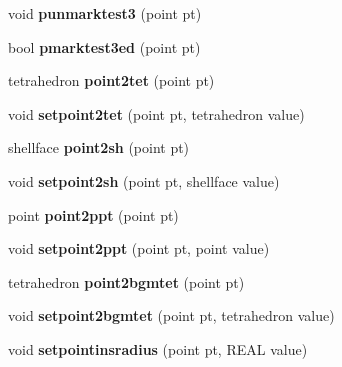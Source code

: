 \begin{DoxyCompactItemize}
\item 
\mbox{\label{classtetgenmesh_a6929e4177a6624086d1280b02a2a72e5}} 
void {\bfseries punmarktest3} (point pt)
\item 
\mbox{\label{classtetgenmesh_a53a459c8e1e5e220658ed6540577629e}} 
bool {\bfseries pmarktest3ed} (point pt)
\item 
\mbox{\label{classtetgenmesh_a6c3e38cde82f108d0c0ca90d1a046931}} 
tetrahedron {\bfseries point2tet} (point pt)
\item 
\mbox{\label{classtetgenmesh_adcba3dbce598107f18e9990c733a20ed}} 
void {\bfseries setpoint2tet} (point pt, tetrahedron value)
\item 
\mbox{\label{classtetgenmesh_a71c1fce651aaffe6e7db6c1f64f7f67d}} 
shellface {\bfseries point2sh} (point pt)
\item 
\mbox{\label{classtetgenmesh_a7f6bda7c35edc24c58af75365b42398c}} 
void {\bfseries setpoint2sh} (point pt, shellface value)
\item 
\mbox{\label{classtetgenmesh_aec54de533203c1b8371a085c1a8b9783}} 
point {\bfseries point2ppt} (point pt)
\item 
\mbox{\label{classtetgenmesh_a1a212c15e5f467b3baf68cd79217ed99}} 
void {\bfseries setpoint2ppt} (point pt, point value)
\item 
\mbox{\label{classtetgenmesh_a3cb62ec0ca76c3f770e82620151b2398}} 
tetrahedron {\bfseries point2bgmtet} (point pt)
\item 
\mbox{\label{classtetgenmesh_a28fee8bde806c0943c547c942d345720}} 
void {\bfseries setpoint2bgmtet} (point pt, tetrahedron value)
\item 
\mbox{\label{classtetgenmesh_ab6c839cb3352d18112a13f76f41ce967}} 
void {\bfseries setpointinsradius} (point pt, R\+E\+AL value)
\item 
\mbox{\label{classtetgenmesh_afa0b4bc0644cf85486f22aeea86411d7}} 

\end{DoxyCompactItemize}
